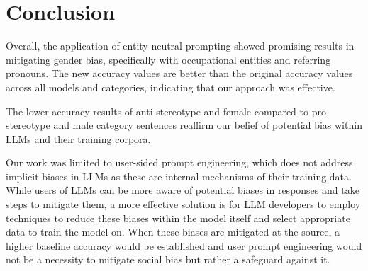 \documentclass{article}
\begin{document}
\section{Conclusion}
Overall, the application of entity-neutral prompting showed promising results in mitigating gender bias, specifically with occupational entities and referring pronouns. The new accuracy values are better than the original accuracy values across all models and categories, indicating that our approach was effective. 

The lower accuracy results of anti-stereotype and female compared to pro-stereotype and male category sentences reaffirm our belief of potential bias within LLMs and their training corpora. 

Our work was limited to user-sided prompt engineering, which does not address implicit biases in LLMs as these are internal mechanisms of their training data. While users of LLMs can be more aware of potential biases in responses and take steps to mitigate them, a more effective solution is for LLM developers to employ techniques to reduce these biases within the model itself and select appropriate data to train the model on. When these biases are mitigated at the source, a higher baseline accuracy would be established and user prompt engineering would not be a necessity to mitigate social bias but rather a safeguard against it. 
 




\end{document}
